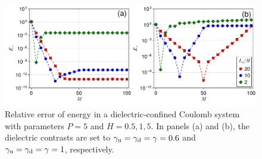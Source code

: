 \begin{figure}[htbp]
    \centering
    \includegraphics[width=0.98\linewidth]{figs/icm_elc_error.pdf}
    \caption{Relative error of energy in a dielectric-confined Coulomb system with parameters $P = 5$ and $H = 0.5, 1, 5$. In panels (a) and (b), the dielectric contrasts are set to $\gamma_{\text{u}} = \gamma_{\text{d}} = \gamma = 0.6$ and $\gamma_{\text{u}} = \gamma_{\text{d}} = \gamma = 1$, respectively.}
    \label{fig:icm_elc_error}
\end{figure}